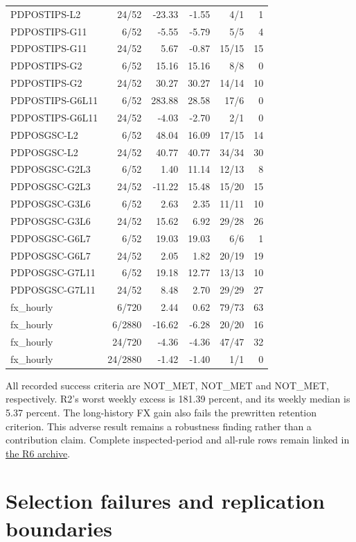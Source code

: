 \documentclass[11pt,a4paper]{article}
\begin{document}
\begin{longtable}{p{35mm}rrrrr}
PDPOSTIPS-L2 & 24/52 & -23.33 & -1.55 & 4/1 & 1 \\
PDPOSTIPS-G11 & 6/52 & -5.55 & -5.79 & 5/5 & 4 \\
PDPOSTIPS-G11 & 24/52 & 5.67 & -0.87 & 15/15 & 15 \\
PDPOSTIPS-G2 & 6/52 & 15.16 & 15.16 & 8/8 & 0 \\
PDPOSTIPS-G2 & 24/52 & 30.27 & 30.27 & 14/14 & 10 \\
PDPOSTIPS-G6L11 & 6/52 & 283.88 & 28.58 & 17/6 & 0 \\
PDPOSTIPS-G6L11 & 24/52 & -4.03 & -2.70 & 2/1 & 0 \\
PDPOSGSC-L2 & 6/52 & 48.04 & 16.09 & 17/15 & 14 \\
PDPOSGSC-L2 & 24/52 & 40.77 & 40.77 & 34/34 & 30 \\
PDPOSGSC-G2L3 & 6/52 & 1.40 & 11.14 & 12/13 & 8 \\
PDPOSGSC-G2L3 & 24/52 & -11.22 & 15.48 & 15/20 & 15 \\
PDPOSGSC-G3L6 & 6/52 & 2.63 & 2.35 & 11/11 & 10 \\
PDPOSGSC-G3L6 & 24/52 & 15.62 & 6.92 & 29/28 & 26 \\
PDPOSGSC-G6L7 & 6/52 & 19.03 & 19.03 & 6/6 & 1 \\
PDPOSGSC-G6L7 & 24/52 & 2.05 & 1.82 & 20/19 & 19 \\
PDPOSGSC-G7L11 & 6/52 & 19.18 & 12.77 & 13/13 & 10 \\
PDPOSGSC-G7L11 & 24/52 & 8.48 & 2.70 & 29/29 & 27 \\
fx\_hourly & 6/720 & 2.44 & 0.62 & 79/73 & 63 \\
fx\_hourly & 6/2880 & -16.62 & -6.28 & 20/20 & 16 \\
fx\_hourly & 24/720 & -4.36 & -4.36 & 47/47 & 32 \\
fx\_hourly & 24/2880 & -1.42 & -1.40 & 1/1 & 0 \\
\end{longtable}
\endgroup

All recorded success criteria are NOT\_MET,
NOT\_MET and NOT\_MET, respectively.
R2's worst weekly excess is 181.39 percent,
and its weekly median is 5.37 percent.
The long-history FX gain also fails the prewritten retention criterion.
This adverse result remains a robustness finding rather than a contribution
claim. Complete inspected-period and all-rule rows remain linked in
\href{https://github.com/ByronLi0207/financial-mathematics-paper-20261020/blob/revision-v7-final/results/supervisor-20261023/r6/README.md}{the R6 archive}.\section{Selection failures and replication boundaries}\label{sup:selection-failures}
\end{document}
